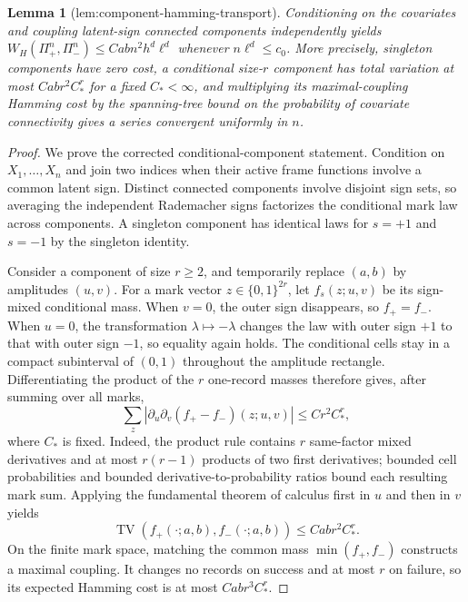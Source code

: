 \documentclass{article}
\newtheorem{lemma}{Lemma}
\begin{document}
\begin{lemma}[lem:component-hamming-transport]\label{lem:component-hamming-transport}
Conditioning on the covariates and coupling latent-sign connected components independently yields \(W_H(\Pi_+^n,\Pi_-^n)\le Cabn^2h^d\ell^d\) whenever \(n\ell^d\le c_0\). More precisely, singleton components have zero cost, a conditional size-\(r\) component has total variation at most \(Cabr^2C_*^r\) for a fixed \(C_*<\infty\), and multiplying its maximal-coupling Hamming cost by the spanning-tree bound on the probability of covariate connectivity gives a series convergent uniformly in \(n\).
\end{lemma}
\begin{proof}
We prove the corrected conditional-component statement.  Condition on \(X_1,\ldots,X_n\) and join two indices when their active frame functions involve a common latent sign.  Distinct connected components involve disjoint sign sets, so averaging the independent Rademacher signs factorizes the conditional mark law across components.  A singleton component has identical laws for \(s=+1\) and \(s=-1\) by the singleton identity.

Consider a component of size \(r\ge2\), and temporarily replace \((a,b)\) by amplitudes \((u,v)\).  For a mark vector \(z\in\{0,1\}^{2r}\), let \(f_s(z;u,v)\) be its sign-mixed conditional mass.  When \(v=0\), the outer sign disappears, so \(f_+=f_-\).  When \(u=0\), the transformation \(\lambda\mapsto-\lambda\) changes the law with outer sign \(+1\) to that with outer sign \(-1\), so equality again holds.  The conditional cells stay in a compact subinterval of \((0,1)\) throughout the amplitude rectangle.  Differentiating the product of the \(r\) one-record masses therefore gives, after summing over all marks,
\[
 \sum_z\left|\partial_u\partial_v(f_+-f_-)(z;u,v)\right|
 \le Cr^2C_*^r,                                           \tag{13}
\]
where \(C_*\) is fixed.  Indeed, the product rule contains \(r\) same-factor mixed derivatives and at most \(r(r-1)\) products of two first derivatives; bounded cell probabilities and bounded derivative-to-probability ratios bound each resulting mark sum.  Applying the fundamental theorem of calculus first in \(u\) and then in \(v\) yields
\[
 \operatorname{TV}(f_+(\cdot;a,b),f_-(\cdot;a,b))
 \le Cabr^2C_*^r.                                        \tag{14}
\]
On the finite mark space, matching the common mass \(\min(f_+,f_-)\) constructs a maximal coupling.  It changes no records on success and at most \(r\) on failure, so its expected Hamming cost is at most \(Cabr^3C_*^r\).


\end{proof}
\end{document}
